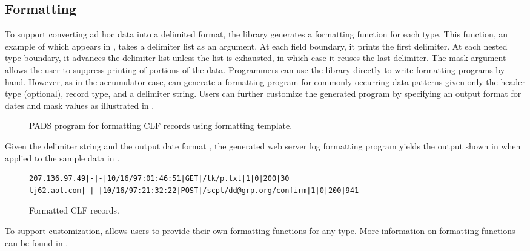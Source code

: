 \subsection{Formatting}
To support converting ad hoc data into a delimited format, the \pads{}
library generates a formatting function for each type.  This function,
an example of which appears in , takes a delimiter
list as an argument.  At each field boundary, it prints the first delimiter.
At each nested type boundary, it advances the delimiter list unless the list
is exhausted, in which case it reuses the last delimiter.  The mask argument
allows the user to suppress printing of portions of the data.  Programmers
can use the library directly to write formatting programs by hand.  However, 
as in the accumulator case, \pads{} can generate a formatting program for 
commonly occurring data patterns given only the header type (optional), record type, and a delimiter string.  Users can further customize the generated program by specifying an output format for dates and mask values as illustrated in 
.
\begin{figure*}
\begin{small}
\caption{PADS program for formatting CLF records using formatting template.}
\label{figure:wsl-fmt}
\end{small}
\end{figure*}
Given the delimiter
string  and the output date format , the generated
web server log formatting program yields
the output shown in  when applied to the
sample data in . 
\begin{figure*}
\begin{small}
\begin{verbatim}
207.136.97.49|-|-|10/16/97:01:46:51|GET|/tk/p.txt|1|0|200|30
tj62.aol.com|-|-|10/16/97:21:32:22|POST|/scpt/dd@grp.org/confirm|1|0|200|941
\end{verbatim}
\caption{Formatted CLF records.}
\label{figure:clf-records-formatted}
\end{small}
\end{figure*}


To support customization, \pads{} allows users to provide their own formatting functions for any type.  More information on formatting functions can be found in .


